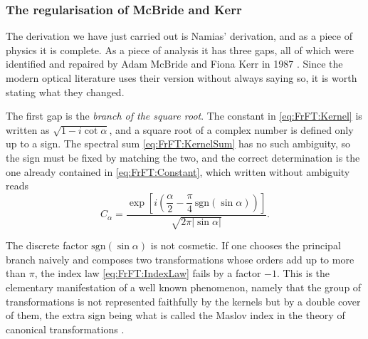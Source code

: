 		\subsubsection{The regularisation of McBride and Kerr}

			The derivation we have just carried out is Namias' derivation, and as a piece of physics it is complete. As a piece of analysis it has three gaps, all of which were identified and repaired by Adam McBride and Fiona Kerr in 1987 \citep{mcbride1987namias}. Since the modern optical literature uses their version without always saying so, it is worth stating what they changed.

			The first gap is the \emph{branch of the square root}. The constant in \eqref{eq:FrFT:Kernel} is written as $\sqrt{1-i\cot\alpha}$, and a square root of a complex number is defined only up to a sign. The spectral sum \eqref{eq:FrFT:KernelSum} has no such ambiguity, so the sign must be fixed by matching the two, and the correct determination is the one already contained in \eqref{eq:FrFT:Constant}, which written without ambiguity reads
			\begin{equation}\label{eq:FrFT:Branch}
				C_{\alpha} = \frac{\exp\left[i\left(\dfrac{\alpha}{2} - \dfrac{\pi}{4}\,\mathrm{sgn}\left(\sin\alpha\right)\right)\right]}{\sqrt{2\pi\left|\sin\alpha\right|}}.
			\end{equation}

			The discrete factor $\mathrm{sgn}(\sin\alpha)$ is not cosmetic. If one chooses the principal branch naively and composes two transformations whose orders add up to more than $\pi$, the index law \eqref{eq:FrFT:IndexLaw} fails by a factor $-1$. This is the elementary manifestation of a well known phenomenon, namely that the group of transformations is not represented faithfully by the kernels but by a double cover of them, the extra sign being what is called the Maslov index in the theory of canonical transformations \citep{moshinsky1971linear, wolf1979integral}.

